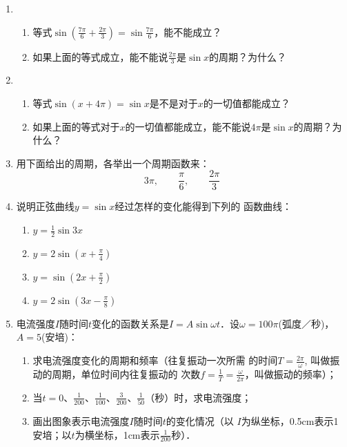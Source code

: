 \begin{enumerate}
\item \begin{enumerate}
    \item 等式$\sin\left(\frac{7\pi}{6}+\frac{2\pi}{3}\right)=\sin\frac{7\pi}{6}$，能不能成立？
    \item 如果上面的等式成立，能不能说$\frac{2\pi}{3}$是$\sin x$的周期？为什么？
\end{enumerate}

\item \begin{enumerate}
    \item 等式$\sin(x+4\pi)=\sin x$是不是对于$x$的一切值都能成立？
    \item 如果上面的等式对于$x$的一切值都能成立，能不能说$4\pi$是$\sin x$的周期？为什么？
\end{enumerate}

\item 用下面给出的周期，各举出一个周期函数来：
\[3\pi,\qquad \frac{\pi}{6},\qquad \frac{2\pi}{3}\]

\item 说明正弦曲线$y=\sin x$经过怎样的变化能得到下列的
函数曲线：
\begin{multicols}{2}
\begin{enumerate}
    \item $y=\frac{1}{2}\sin 3x$
    \item $y=2\sin\left(x+\frac{\pi}{4}\right)$
    \item $y=\sin\left(2x+\frac{\pi}{2}\right)$
    \item $y=2\sin\left(3x-\frac{\pi}{8}\right)$
\end{enumerate}
\end{multicols}

\item 电流强度$I$随时间$t$变化的函数关系是$I=A\sin\omega t$．设$\omega=100\pi$(弧度／秒)，$A=5$(安培)：
\begin{enumerate}
    \item 求电流强度变化的周期和频率（往复振动一次所需
的时间$T=\frac{2\pi}{\omega}$, 叫做振动的周期，单位时间内往复振动的
次数$f=\frac{1}{T}=\frac{\omega}{2\pi}$，叫做振动的频率）；
\item 当$t=0$、$\frac{1}{200}$、$\frac{1}{100}$、$\frac{3}{200}$、$\frac{1}{50}$（秒）时，求电流强度；
\item 画出图象表示电流强度$I$随时间$t$的变化情况（以
$I$为纵坐标，0.5cm表示1安培；以$t$为横坐标，1cm表示$\frac{1}{200}$秒）．
\end{enumerate}


\end{enumerate}
